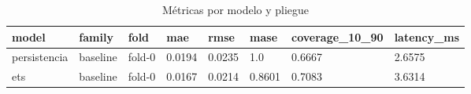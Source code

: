\begin{table}[ht]\centering\caption{Métricas por modelo y pliegue}\begin{tabular}{llllllll}\hline
model & family & fold & mae & rmse & mase & coverage_10_90 & latency_ms \\\hline
persistencia & baseline & fold-0 & 0.0194 & 0.0235 & 1.0 & 0.6667 & 2.6575 \\
ets & baseline & fold-0 & 0.0167 & 0.0214 & 0.8601 & 0.7083 & 3.6314 \\\hline\end{tabular}\end{table}
